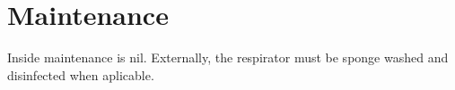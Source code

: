 \section{Maintenance}
    Inside maintenance is nil. Externally, the respirator must be sponge washed and disinfected when aplicable.
